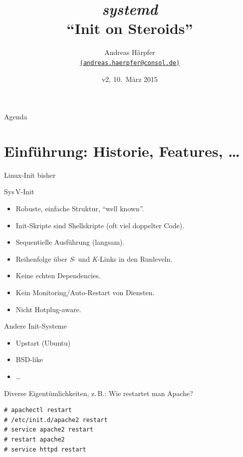 
\title[systemd]{\emph{\huge systemd}\\[1ex] ``Init on Steroids''}
\author[Andreas Härpfer]{Andreas Härpfer \\
  {\scriptsize \href{mailto:andreas.haerpfer@consol.de}
   {\nolinkurl{(andreas.haerpfer@consol.de)}}}}
\date{v2, 10.~März 2015}

\subject{systemd}






\begin{frame}[plain]
\titlepage
\end{frame}

\begin{frame}{Agenda}
\tableofcontents
\end{frame}

\section[Einführung]{Einführung: Historie, Features, \dots}

\begin{frame}{Linux-Init bisher}
\begin{block}{Sys\,V-Init}
\begin{itemize}
\item Robuste, einfache Struktur, ``well known''.
\item Init-Skripte sind Shellskripte (oft viel doppelter Code).
\item Sequentielle Ausführung (langsam).
\item Reihenfolge über \emph{S}- und \emph{K}-Links in den Runleveln.
\item Keine echten Dependencies.
\item Kein Monitoring/Auto-Restart von Diensten.
\item Nicht Hotplug-aware.
\end{itemize}
\end{block}

\begin{block}{Andere Init-Systeme}
\begin{itemize}
\item Upstart (Ubuntu)
\item BSD-like
\item \dots
\end{itemize}
\end{block}

\framebreak
Diverse Eigentümlichkeiten, z.\,B.: Wie restartet man Apache?

\begin{lstlisting}[style=numbered]
# apachectl restart
# /etc/init.d/apache2 restart
# service apache2 restart
# restart apache2
# service httpd restart
\end{lstlisting}
\end{frame}


